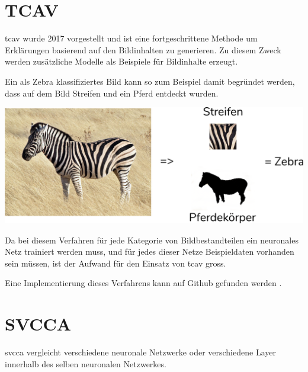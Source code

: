 \documentclass[
  12pt, %
  a4paper, %
  oneside, %
  openany, 
  numbers=noenddot, %
  BCOR=5mm, %
  parskip=half*, %
  thesis, %
]{bfhbook}
\begin{document}
\section{TCAV}
 \Gls{tcav} wurde 2017 vorgestellt \parencite{Kim2017} und ist eine fortgeschrittene Methode um Erklärungen basierend auf den Bildinhalten zu generieren. Zu diesem Zweck werden zusätzliche Modelle als Beispiele für Bildinhalte erzeugt.
 
 Ein als Zebra klassifiziertes Bild kann so zum Beispiel damit begründet werden, dass auf dem Bild Streifen und ein Pferd entdeckt wurden.
\begin{center}
\begin{minipage}[t]{\linewidth}
\includegraphics[width=\textwidth]{Bilder/Zebra-Explanation.PNG}
\end{minipage}
\end{center}
Da bei diesem Verfahren für jede Kategorie von Bildbestandteilen ein neuronales Netz trainiert werden muss, und für jedes dieser Netze Beispieldaten vorhanden sein müssen, ist der Aufwand für den Einsatz von \Gls{tcav} gross. 

Eine Implementierung dieses Verfahrens kann auf Github gefunden werden \cite{tcavLink}.

\section{SVCCA}
\acrlong{svcca} \parencite{Raghu2017} vergleicht verschiedene neuronale Netzwerke oder verschiedene Layer innerhalb des selben neuronalen Netzwerkes.
\end{document}
